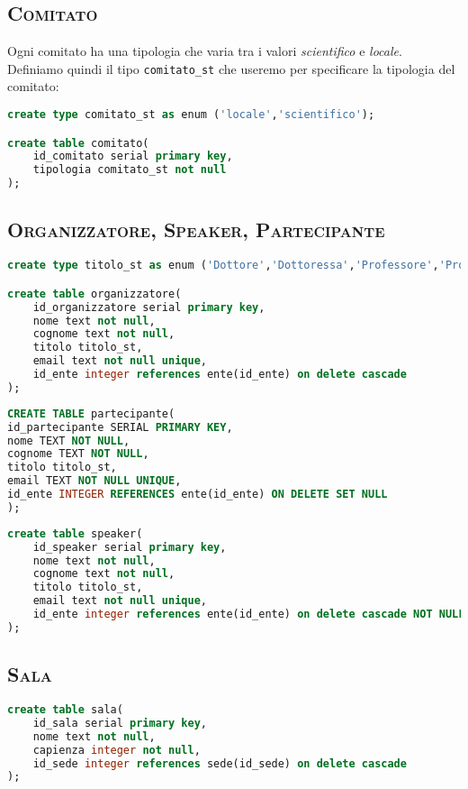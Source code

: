\subsection{\textsc{Comitato}}
Ogni comitato ha una tipologia che varia tra i valori \textit{scientifico} e \textit{locale}. Definiamo quindi il tipo \texttt{comitato\_st} che useremo per specificare la tipologia del comitato:
\begin{lstlisting}[language=SQL,style=mystyle,caption={Tabella: Comitato}]
create type comitato_st as enum ('locale','scientifico');

create table comitato(
    id_comitato serial primary key,
    tipologia comitato_st not null
);
\end{lstlisting}
\subsection{\textsc{Organizzatore, Speaker, Partecipante}}
\begin{lstlisting}[language=SQL,style=mystyle,caption={Tabella: Organizzatore}]
create type titolo_st as enum ('Dottore','Dottoressa','Professore','Professoressa','Assistente','Ricercatore','Ricercatrice','Ingegnere');

create table organizzatore(
    id_organizzatore serial primary key,
    nome text not null,
    cognome text not null,
    titolo titolo_st,
    email text not null unique,
    id_ente integer references ente(id_ente) on delete cascade
);
\end{lstlisting}
\begin{lstlisting}[language=SQL,style=mystyle,caption={Tabella: Partecipante}]
CREATE TABLE partecipante(
id_partecipante SERIAL PRIMARY KEY,
nome TEXT NOT NULL,
cognome TEXT NOT NULL,
titolo titolo_st,
email TEXT NOT NULL UNIQUE, 
id_ente INTEGER REFERENCES ente(id_ente) ON DELETE SET NULL
);
\end{lstlisting}
\begin{lstlisting}[language=SQL,style=mystyle, caption={Tabella: Speaker}]
create table speaker(
    id_speaker serial primary key,
    nome text not null,
    cognome text not null,
    titolo titolo_st,
    email text not null unique,
    id_ente integer references ente(id_ente) on delete cascade NOT NULL
);

\end{lstlisting}
\subsection{\textsc{Sala}}
\begin{lstlisting}[language=SQL,style=mystyle,caption={Tabella: Sala}]
create table sala(
    id_sala serial primary key,
    nome text not null,
    capienza integer not null,
    id_sede integer references sede(id_sede) on delete cascade
);
\end{lstlisting}
